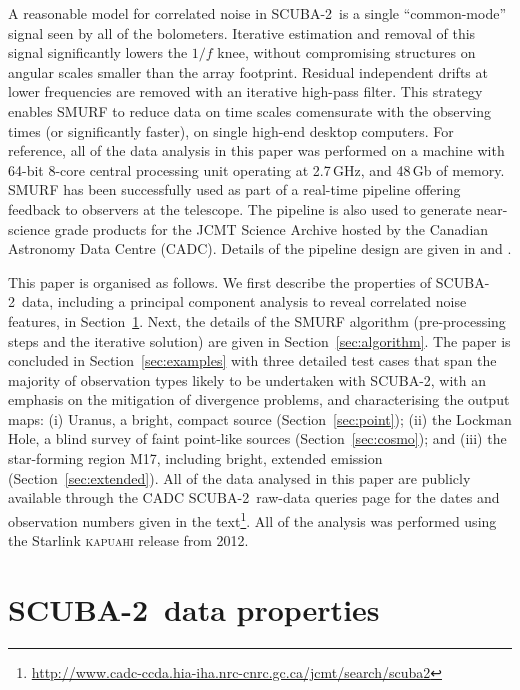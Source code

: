 \documentclass[useAMS,usenatbib,nofootinbib]{mn2e}
\newcommand{\scuba}{SCUBA-2}
\begin{document}
A reasonable model for correlated noise in \scuba\ is a single
``common-mode'' signal seen by all of the bolometers. Iterative
estimation and removal of this signal significantly lowers the $1/f$
knee, without compromising structures on angular scales smaller than
the array footprint. Residual independent drifts at lower frequencies
are removed with an iterative high-pass filter. This strategy enables
SMURF to reduce data on time scales comensurate with the observing
times (or significantly faster), on single high-end desktop
computers. For reference, all of the data analysis in this paper was
performed on a machine with 64-bit 8-core central processing unit
operating at 2.7\,GHz, and 48\,Gb of memory. SMURF has been
successfully used as part of a real-time pipeline offering feedback to
observers at the telescope. The pipeline is also used to generate
near-science grade products for the JCMT Science Archive
\citep{2011ASPC..442..203E} hosted by the Canadian Astronomy Data
Centre (CADC). Details of the pipeline design are given in
\citet{gibb2005} and \citet{2008AN....329..295C}.

This paper is organised as follows. We first describe the properties
of \scuba\ data, including a principal component analysis to reveal
correlated noise features, in Section~\ref{sec:data}. Next, the
details of the SMURF algorithm (pre-processing steps and the iterative
solution) are given in Section~\ref{sec:algorithm}. The paper is
concluded in Section~\ref{sec:examples} with three detailed test cases
that span the majority of observation types likely to be undertaken
with \scuba, with an emphasis on the mitigation of divergence
problems, and characterising the output maps: (i) Uranus, a bright,
compact source (Section~\ref{sec:point}); (ii) the Lockman Hole, a
blind survey of faint point-like sources (Section~\ref{sec:cosmo});
and (iii) the star-forming region M17, including bright, extended
emission (Section~\ref{sec:extended}). All of the data analysed in
this paper are publicly available through the CADC \scuba\ raw-data
queries page for the dates and observation numbers given in the
text\footnote{\url{http://www.cadc-ccda.hia-iha.nrc-cnrc.gc.ca/jcmt/search/scuba2}}.
All of the analysis was performed using the Starlink \textsc{kapuahi}
release from 2012.

\section{\scuba\ data properties}
\label{sec:data}
\end{document}
